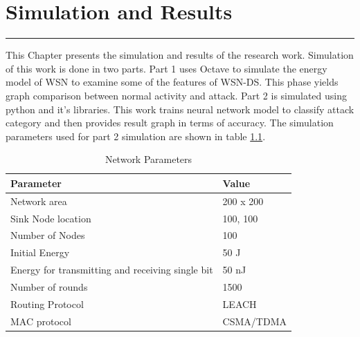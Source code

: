 \chapter{Simulation and Results}
\label{C6} %
\graphicspath{{Figures/PDF/}{Figures/PNG}}
\noindent\rule{\linewidth}{2pt}
This Chapter presents the simulation and results of the research work. Simulation of this work is done in two parts. Part 1 uses Octave to simulate the energy model of WSN to examine some of the features of WSN-DS. This phase yields graph comparison between normal activity and attack. Part 2 is simulated using python and it's libraries. This work trains neural network model to classify attack category and then provides result graph in terms of accuracy. The simulation parameters used for part 2 simulation are shown in table \ref{tab:NetPar}.
\begin{table}[]
\centering
\caption{Network Parameters}
\label{tab:NetPar}
\begin{tabular}{|l|l|}
\hline
\textbf{Parameter} & \textbf{Value} \\ \hline
Network area & 200 x 200 \\ \hline
Sink Node location & 100, 100 \\ \hline
Number of Nodes & 100 \\ \hline
Initial Energy & 50 J \\ \hline
Energy for transmitting and receiving single bit & 50 nJ \\ \hline
Number of rounds & 1500 \\ \hline
Routing Protocol & LEACH \\ \hline
MAC protocol & CSMA/TDMA \\ \hline
\end{tabular}%
\end{table}
